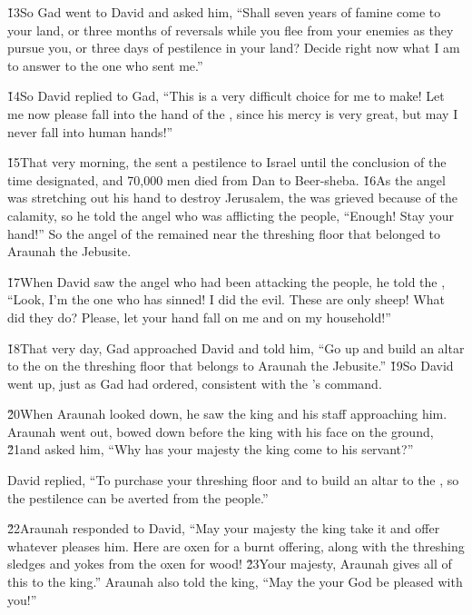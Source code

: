 \v{13}So Gad went to David and asked him, ``Shall seven years of famine come to your land, or three months of reversals while you flee from your enemies as they pursue you, or three days of pestilence in your land? Decide right now what I am to answer to the one who sent me.''

\v{14}So David replied to Gad, ``This is a very difficult choice for me to make! Let me now please fall into the hand of the , since his mercy is very great, but may I never fall into human hands!''

\v{15}That very morning, the  sent a pestilence to Israel until the conclusion of the time designated, and 70,000 men died from Dan to Beer-sheba. \v{16}As the angel was stretching out his hand to destroy Jerusalem, the  was grieved because of the calamity, so he told the angel who was afflicting the people, ``Enough! Stay your hand!'' So the angel of the  remained near the threshing floor that belonged to Araunah the Jebusite.

\v{17}When David saw the angel who had been attacking the people, he told the , ``Look, I'm the one who has sinned! I did the evil. These are only sheep! What did they do? Please, let your hand fall on me and on my household!''

\v{18}That very day, Gad approached David and told him, ``Go up and build an altar to the  on the threshing floor that belongs to Araunah the Jebusite.'' \v{19}So David went up, just as Gad had ordered, consistent with the 's command.

\v{20}When Araunah looked down, he saw the king and his staff approaching him. Araunah went out, bowed down before the king with his face on the ground, \v{21}and asked him, ``Why has your majesty the king come to his servant?''

David replied, ``To purchase your threshing floor and to build an altar to the , so the pestilence can be averted from the people.''

\v{22}Araunah responded to David, ``May your majesty the king take it and offer whatever pleases him. Here are oxen for a burnt offering, along with the threshing sledges and yokes from the oxen for wood! \v{23}Your majesty, Araunah gives all of this to the king.'' Araunah also told the king, ``May the  your God be pleased with you!''

